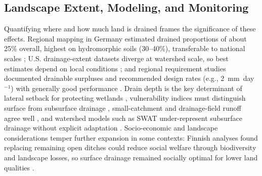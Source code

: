 \documentclass[11pt]{article}
\begin{document}
\subsection{Landscape Extent, Modeling, and Monitoring}

Quantifying where and how much land is drained frames the significance of these
effects. Regional mapping in Germany estimated drained proportions of about 25\%
overall, highest on hydromorphic soils (30--40\%), transferable to national scales
\parencite{Hirt2005,Hirt2011}; U.S. drainage-extent datasets diverge at watershed
scale, so best estimates depend on local conditions \parencite{Jame2022}; and
regional requirement studies documented drainable surpluses and recommended design
rates (e.g., 2~mm~day$^{-1}$) with generally good performance
\parencite{Kumar2006,Güngör2023,Ali2001,MartínezBeltrán2007,Rimidis2003}. Drain
depth is the key determinant of lateral setback for protecting wetlands
\parencite{Tangen2018}, vulnerability indices must distinguish surface from
subsurface drainage \parencite{Baffaut2020}, small-catchment and drainage-field
runoff agree well \parencite{Veinbergs2022}, and watershed models such as SWAT
under-represent subsurface drainage without explicit adaptation
\parencite{Manguerra1998,Golmohammadi2016}. Socio-economic and landscape
considerations temper further expansion in some contexts: Finnish analyses found
replacing remaining open ditches could reduce social welfare through biodiversity
and landscape losses, so surface drainage remained socially optimal for lower land
qualities \parencite{HietalaKoivu2004,Saikkonen2014}.
\end{document}
